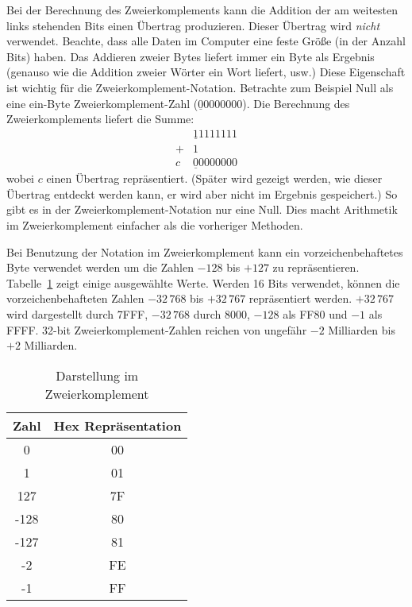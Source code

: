Bei der Berechnung des Zweierkomplements kann die Addition der am
weitesten links stehenden Bits einen \"{U}bertrag produzieren. Dieser
\"{U}ber\-trag wird \emph{nicht} verwendet. Beachte, dass alle Daten im
Computer eine feste Gr\"{o}{\ss}e (in der Anzahl Bits) haben. Das Addieren
zweier Bytes liefert immer ein Byte als Ergebnis (genauso wie die
Addition zweier W\"{o}rter ein Wort liefert, usw.) Diese Eigenschaft ist
wichtig f\"{u}r die Zweierkomplement-Notation. Betrachte zum Beispiel
Null als eine ein-Byte Zweierkomplement-Zahl
($\underline{0}0000000$). Die Berechnung des Zweierkomplements
liefert die Summe:
\[
\begin{array}{rr}
  & \underline{1}1111111 \\
 +&                    1 \\
 \hline
 c& \underline{0}0000000
\end{array}
\]
wobei $c$ einen \"{U}bertrag repr\"{a}sentiert. (Sp\"{a}ter wird gezeigt werden,
wie dieser \"{U}bertrag entdeckt werden kann, er wird aber nicht im
Ergebnis gespeichert.) So gibt es in der Zweierkomplement-Notation
nur eine Null. Dies macht Arithmetik im Zweierkomplement einfacher
als die vorheriger Methoden.

Bei Benutzung der Notation im Zweierkomplement kann ein
vorzeichenbehaftetes Byte verwendet werden um die Zahlen $-128$ bis
$+127$ zu repr\"{a}sentieren. Tabelle~\ref{tab:twocomp} zeigt einige
ausgew\"{a}hlte Werte. Werden 16 Bits verwendet, k\"{o}nnen die
vorzeichenbehafteten Zahlen $-32\,768$ bis $+32\,767$ repr\"{a}sentiert
werden. $+32\,767$ wird dargestellt durch 7FFF, $-32\,768$ durch
8000, $-128$ als FF80 und $-1$ als FFFF\@. 32-bit
Zweierkomplement-Zahlen reichen von ungef\"{a}hr $-2$ Milliarden bis
$+2$ Milliarden.

\begin{table}[ht]
\centering
\begin{tabular}{||c|c||}
 \hline
 Zahl & Hex Repr\"{a}sentation \\
 \hline
    0 & 00 \\
    1 & 01 \\
  127 & 7F \\
 -128 & 80 \\
 -127 & 81 \\
   -2 & FE \\
   -1 & FF \\
 \hline
\end{tabular}
\caption{Darstellung im Zweierkomplement \label{tab:twocomp}}
\end{table}


